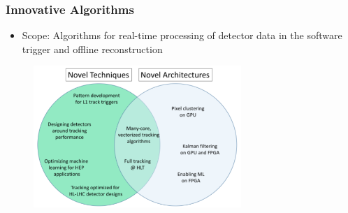 \begin{frame}
\frametitle{Innovative Algorithms}

\begin{itemize}
\item Scope: Algorithms for real-time processing of detector data in the software trigger and offline reconstruction 
\end{itemize}

\begin{figure}[htbp]
\begin{center}
\includegraphics[width=0.7\textwidth]{images/IA-Venn.png}
\end{center}
\end{figure}

\end{frame}


